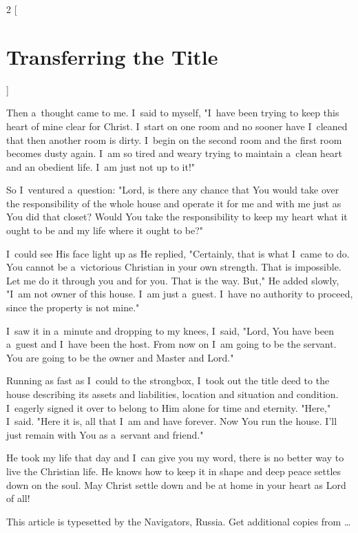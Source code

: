 \documentclass[a4paper,12pt]{article}
\begin{document}
\begin{multicols}{2}
    [
\section*{Transferring the Title}
    ]

Then a~thought came to me. I~said to myself, "I~have been trying to keep this heart of mine clear for Christ. I~start on one room and no sooner have I~cleaned that then another room is dirty. I~begin on the second room and the first room becomes dusty again. I~am so tired and weary trying to maintain a~clean heart and an obedient life. I~am just not up to it!" 

So I~ventured a~question: "Lord, is there any chance that You would take over the responsibility of the whole house and operate it for me and with me just as You did that closet? Would You take the responsibility to keep my heart what it ought to be and my life where it ought to be?" 

I~could see His face light up as He replied, "Certainly, that is what I~came to do. You cannot be a~victorious Christian in your own strength. That is impossible. Let me do it through you and for you. That is the way. But," He added slowly, "I~am not owner of this house. I~am just a~guest. I~have no authority to proceed, since the property is not mine." 

I~saw it in a~minute and dropping to my knees, I~said, "Lord, You have been a~guest and I~have been the host. From now on I~am going to be the servant. You are going to be the owner and Master and Lord." 

Running as fast as I~could to the strongbox, I~took out the title deed to the house describing its assets and liabilities, location and situation and condition. I~eagerly signed it over to belong to Him alone for time and eternity. "Here," I~said. "Here it is, all that I~am and have forever. Now You run the house. I'll just remain with You as a~servant and friend." 

He took my life that day and I~can give you my word, there is no better way to live the Christian life. He knows how to keep it in shape and deep peace settles down on the soul. May Christ settle down and be at home in your heart as Lord of all! 
\end{multicols}

\vfill
{\tiny This article is typesetted by the Navigators, Russia. Get additional copies from \ldots
}
\end{document}
